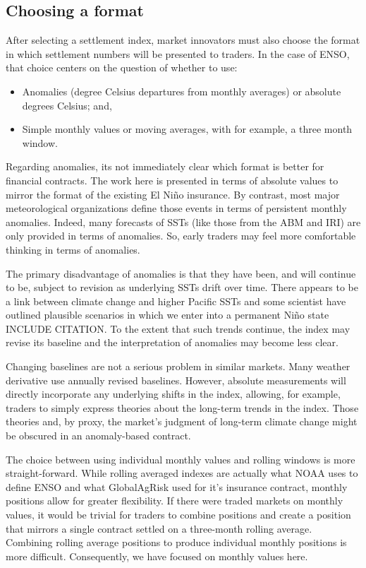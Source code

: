 \documentclass[authoryear]{article}
\begin{document}
\subsection{Choosing a format}
After selecting a settlement index, market innovators must also choose the format in which settlement numbers will be presented to traders. In the case of ENSO, that choice centers on the question of whether to use: 
\begin{itemize}
\item Anomalies (degree Celsius departures from monthly averages) or absolute degrees Celsius; and,
\item Simple monthly values or moving averages, with for example, a three month window.
\end{itemize}

Regarding anomalies, its not immediately clear which format is better for financial contracts. The work here is presented in terms of absolute values to mirror the format of the existing El Ni\~no insurance. By contrast, most major meteorological organizations define those events in terms of persistent monthly anomalies. Indeed, many forecasts of SSTs (like those from the ABM and IRI) are only provided in terms of anomalies. So, early traders may feel more comfortable thinking in terms of anomalies.

The primary disadvantage of anomalies is that they have been, and will continue to be, subject to revision as underlying SSTs drift over time. There appears to be a link between climate change and higher Pacific SSTs and some scientist have outlined plausible scenarios in which we enter into a permanent Ni\~no state INCLUDE CITATION. To the extent that such trends continue, the index may revise its baseline and the interpretation of anomalies may become less clear. 

Changing baselines are not a serious problem in similar markets. Many weather derivative use annually revised baselines. However, absolute measurements will directly incorporate any underlying shifts in the index, allowing, for example, traders to simply express theories about the long-term trends in the index. Those theories and, by proxy, the market's judgment of long-term climate change might be obscured in an anomaly-based contract.

The choice between using individual monthly values and rolling windows is more straight-forward. While rolling averaged indexes are actually what NOAA uses to define ENSO and what GlobalAgRisk used for it's insurance contract, monthly positions allow for greater flexibility. If there were traded markets on monthly values, it would be trivial for traders to combine positions and create a position that mirrors a single contract settled on a three-month rolling average. Combining rolling average positions to produce individual monthly positions is more difficult. Consequently, we have focused on monthly values here.
\end{document}

